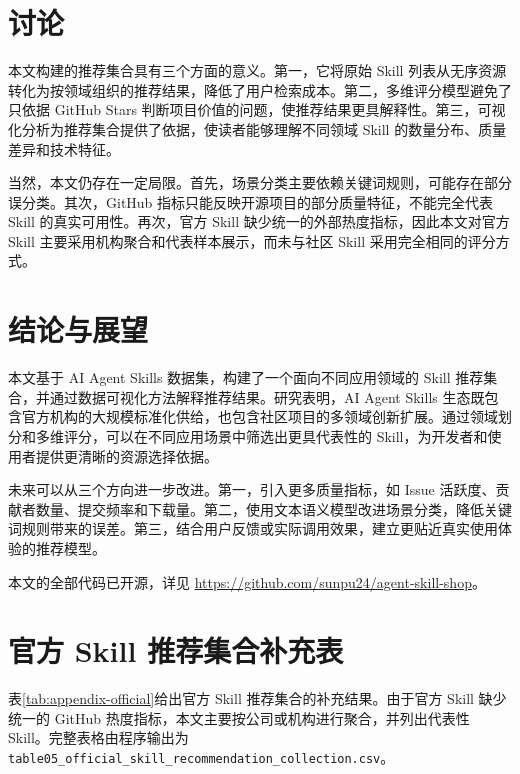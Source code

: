 \documentclass[UTF8,a4paper,12pt]{ctexart}
\begin{document}
\section{讨论}

本文构建的推荐集合具有三个方面的意义。第一，它将原始 Skill 列表从无序资源转化为按领域组织的推荐结果，降低了用户检索成本。第二，多维评分模型避免了只依据 GitHub Stars 判断项目价值的问题，使推荐结果更具解释性。第三，可视化分析为推荐集合提供了依据，使读者能够理解不同领域 Skill 的数量分布、质量差异和技术特征。

当然，本文仍存在一定局限。首先，场景分类主要依赖关键词规则，可能存在部分误分类。其次，GitHub 指标只能反映开源项目的部分质量特征，不能完全代表 Skill 的真实可用性。再次，官方 Skill 缺少统一的外部热度指标，因此本文对官方 Skill 主要采用机构聚合和代表样本展示，而未与社区 Skill 采用完全相同的评分方式。

\section{结论与展望}

本文基于 AI Agent Skills 数据集，构建了一个面向不同应用领域的 Skill 推荐集合，并通过数据可视化方法解释推荐结果。研究表明，AI Agent Skills 生态既包含官方机构的大规模标准化供给，也包含社区项目的多领域创新扩展。通过领域划分和多维评分，可以在不同应用场景中筛选出更具代表性的 Skill，为开发者和使用者提供更清晰的资源选择依据。

未来可以从三个方向进一步改进。第一，引入更多质量指标，如 Issue 活跃度、贡献者数量、提交频率和下载量。第二，使用文本语义模型改进场景分类，降低关键词规则带来的误差。第三，结合用户反馈或实际调用效果，建立更贴近真实使用体验的推荐模型。

本文的全部代码已开源，详见 \url{https://github.com/sunpu24/agent-skill-shop}。

\appendix

\newpage
\section{官方 Skill 推荐集合补充表}

表\ref{tab:appendix-official}给出官方 Skill 推荐集合的补充结果。由于官方 Skill 缺少统一的 GitHub 热度指标，本文主要按公司或机构进行聚合，并列出代表性 Skill。完整表格由程序输出为 \texttt{table05\_official\_skill\_recommendation\_collection.csv}。
\end{document}
